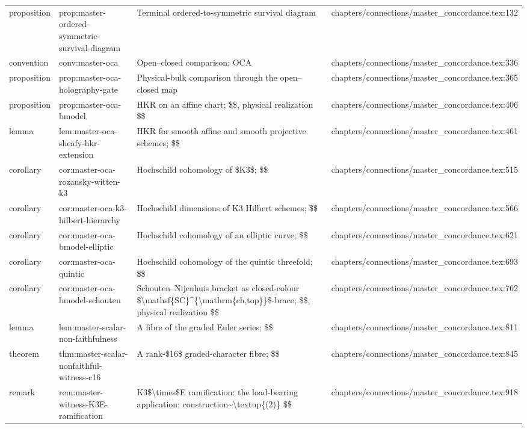 \documentclass[11pt]{article}
\begin{document}
\begin{longtable}{L{0.10\textwidth}L{0.26\textwidth}L{0.42\textwidth}L{0.22\textwidth}}
proposition & prop:master-ordered-symmetric-survival-diagram & Terminal ordered-to-symmetric survival diagram & chapters/connections/master\_concordance.tex:132\\
convention & conv:master-oca & Op{}en--closed comparison; OCA & chapters/connections/master\_concordance.tex:336\\
proposition & prop:master-oca-holography-gate & Physical-bulk comparison through the op{}en--closed map & chapters/connections/master\_concordance.tex:365\\
proposition & prop:master-oca-bmodel & HKR on an affine chart; \$\$, physical realization \$\$ & chapters/connections/master\_concordance.tex:406\\
lemma & lem:master-oca-sheafy-hkr-extension & HKR for smooth affine and smooth projective schemes; \$\$ & chapters/connections/master\_concordance.tex:461\\
corollary & cor:master-oca-rozansky-witten-k3 & Hochschild cohomology of \$K3\$; \$\$ & chapters/connections/master\_concordance.tex:515\\
corollary & cor:master-oca-k3-hilbert-hierarchy & Hochschild dimensions of K3 Hilbert schemes; \$\$ & chapters/connections/master\_concordance.tex:566\\
corollary & cor:master-oca-bmodel-elliptic & Hochschild cohomology of an elliptic curve; \$\$ & chapters/connections/master\_concordance.tex:621\\
corollary & cor:master-oca-quintic & Hochschild cohomology of the quintic threefold; \$\$ & chapters/connections/master\_concordance.tex:693\\
corollary & cor:master-oca-bmodel-schouten & Schouten--Nijenhuis bracket as closed-colour \$\textbackslash{}mathsf\{SC\}\textasciicircum{}\{\textbackslash{}mathrm\{ch,top\}\}\$-brace; \$\$, physical realization \$\$ & chapters/connections/master\_concordance.tex:762\\
lemma & lem:master-scalar-non-faithfulness & A fibre of the graded Euler series; \$\$ & chapters/connections/master\_concordance.tex:811\\
theorem & thm:master-scalar-nonfaithful-witness-c16 & A rank-\$16\$ graded-character fibre; \$\$ & chapters/connections/master\_concordance.tex:845\\
remark & rem:master-witness-K3E-ramification & K3\$\textbackslash{}times\$E ramification: the load-bearing application; construction\textasciitilde{}\textbackslash{}textup\{(2)\} \$\$ & chapters/connections/master\_concordance.tex:918\\

\end{longtable}
\end{document}
